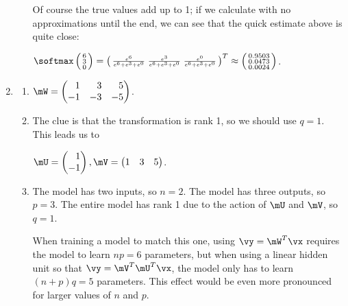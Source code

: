 \documentclass{article}
\begin{document}
\begin{enumerate}
\begin{enumerate}
    Of course the true values add up to 1; if we calculate with no approximations until the end, we can see that the quick estimate above is quite close:
    
    $       \softmax \left(\begin{smallmatrix} 
                        6        \\ 3      \\ 0 
                     \end{smallmatrix} \right)
    =                \left(\begin{smallmatrix} 
                        \frac{e^6}{e^6+e^3+e^0} & 
                        \frac{e^3}{e^6+e^3+e^0} & 
                        \frac{e^0}{e^6+e^3+e^0} 
                     \end{smallmatrix}\right)^T
     \approx         \left(\begin{smallmatrix} 
                        0.9503    \\ 0.0473 \\ 0.0024 
                     \end{smallmatrix} \right)$.              
\end{enumerate}

\item \label{DFN_ex_linearhiddenunit_solution} 
\begin{enumerate}
    \item $\mW = \begin{pmatrix} \phantom{-}1 & \phantom{-}3 & \phantom{-}5 \\ -1 & -3 & -5 \end{pmatrix}$.
    \item The clue is that the transformation is rank 1, so we should use $q = 1$. This leads us to 
    
    $\mU = \begin{pmatrix} \phantom{-}1 \\ -1 \end{pmatrix}, 
           \mV = \begin{pmatrix} 1 & 3 & 5 \end{pmatrix}$.
    \item The model has two inputs, so $n = 2$. The model has three outputs, so $p = 3$. The entire model has rank 1 due to the action of $\mU$ and $\mV$, so $q = 1$. 
    
    When training a model to match this one, using $\vy = \mW^T \vx$ requires the model to learn $np = 6$ parameters, but when using a linear hidden unit so that $\vy = \mV^T \mU^T \vx$, the model only has to learn $(n+p)q = 5$ parameters. This effect would be even more pronounced for larger values of $n$ and $p$.
\end{enumerate}


\end{enumerate}
\end{document}
